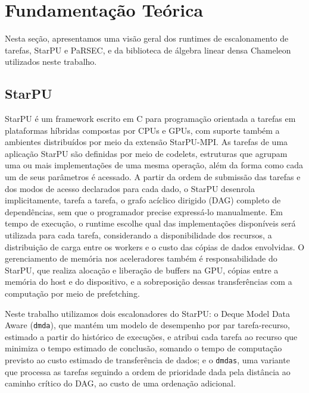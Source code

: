 \documentclass[12pt]{article}
\begin{document}
\section{Fundamentação Teórica}
\label{sec:orgddad28f}
Nesta seção, apresentamos uma visão geral dos runtimes de escalonamento de
tarefas, StarPU e PaRSEC, e da biblioteca de álgebra linear densa Chameleon
utilizados neste trabalho.
\subsection{StarPU}
\label{sec:org674dd58}
StarPU \cite{starpu} é um framework escrito em C para programação orientada a
tarefas em plataformas híbridas compostas por CPUs e GPUs, com suporte também a
ambientes distribuídos por meio da extensão StarPU-MPI. As tarefas de
uma aplicação StarPU são definidas por meio de codelets, estruturas que agrupam
uma ou mais implementações de uma mesma operação, além da forma como cada um de
seus parâmetros é acessado. A partir da ordem de submissão das tarefas e dos
modos de acesso declarados para cada dado, o StarPU desenrola implicitamente,
tarefa a tarefa, o grafo acíclico dirigido (DAG) completo de dependências, sem
que o programador precise expressá-lo manualmente. Em tempo de execução, o
runtime escolhe qual das implementações disponíveis será utilizada para cada
tarefa, considerando a disponibilidade dos recursos, a distribuição de carga
entre os workers e o custo das cópias de dados envolvidas. O gerenciamento de
memória nos aceleradores também é responsabilidade do StarPU, que realiza
alocação e liberação de buffers na GPU, cópias entre a memória do host e do
dispositivo, e a sobreposição dessas transferências com a computação por meio de
prefetching.

Neste trabalho utilizamos dois escalonadores do StarPU: o Deque Model Data Aware
(\texttt{dmda}), que mantém um modelo de desempenho por par tarefa-recurso, estimado a
partir do histórico de execuções, e atribui cada tarefa ao recurso que minimiza
o tempo estimado de conclusão, somando o tempo de computação previsto ao custo
estimado de transferência de dados; e o \texttt{dmdas}, uma variante
que processa as tarefas seguindo a ordem de prioridade dada pela distância ao
caminho crítico do DAG, ao custo de uma ordenação adicional.
\end{document}
